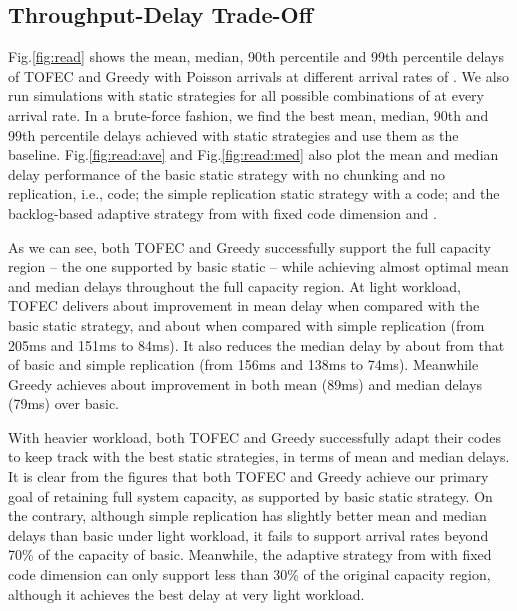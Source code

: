 \documentclass[journal]{IEEEtran}
\newcommand{\comment}[1]{}
\newcommand{\ourproposal}{TOFEC\xspace}
\newcommand{\twowidth}{0.45\columnwidth}
\newcommand{\shrinkbeforecaption}{-5pt}
\newcommand{\shrinkaftercaption}{-14pt}
\begin{document}
\subsection{Throughput-Delay Trade-Off}
Fig.\ref{fig:read} shows the mean, median, 90th percentile and 99th percentile delays of  \ourproposal and Greedy with Poisson arrivals at different arrival rates of . We also run simulations with static strategies for all possible combinations of  at every arrival rate. In a brute-force fashion, we find the best mean, median, 90th and 99th percentile delays achieved with static strategies and use them as the baseline. 
Fig.\ref{fig:read:ave} and Fig.\ref{fig:read:med} also plot the mean and median delay performance of the basic static strategy with no chunking and no replication, i.e.,  code; the simple replication static strategy with a  code; and the backlog-based adaptive strategy from \cite{fastcloud} with fixed code dimension  and . 



As we can see, 
both \ourproposal and Greedy successfully support the full capacity region -- the one supported by basic static -- while achieving almost optimal mean and median delays throughout the full capacity region.
At light workload, \ourproposal delivers about  improvement in mean delay when compared with the basic static strategy, and about  when compared with simple replication (from 205ms and 151ms to 84ms). It also reduces the median delay by about  from that of basic and simple replication (from 156ms and 138ms to 74ms). Meanwhile Greedy achieves about  improvement in both mean (89ms) and median delays (79ms) over basic. 

With heavier workload, both \ourproposal and Greedy successfully adapt their codes to keep track with the best static strategies, in terms of mean and median delays. It is clear from the figures that both \ourproposal and Greedy achieve our primary goal of retaining full system capacity, as supported by basic static strategy. On the contrary, although simple replication has slightly better mean and median delays than basic under light workload, it fails to support arrival rates beyond 70\% of the capacity of basic.
Meanwhile, the adaptive strategy from \cite{fastcloud} with fixed code dimension  can only support less than 30\% of the original capacity region, although it achieves the best delay at very light workload.

\comment{
\begin{figure}[t]
	\subfigure[Average ]{
		\label{fig:read:codeDim}
		\texttt{[image: read\_codeDim]}
	}\subfigure[Average ]{
		\label{fig:read:codeLength}
		\texttt{[image: read\_codeLength]}
	}
\vspace{\shrinkbeforecaption}
\caption{Delay performance in read only scenario}
\label{fig:read:code}
\vspace{\shrinkaftercaption}
\end{figure}
}
\end{document}
